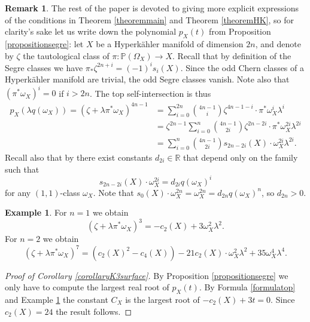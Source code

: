 \documentclass[11pt]{article}
\theoremstyle{plain}
\theoremstyle{definition}
\newtheorem{remark}[theorem]{Remark}
\newtheorem{example}[theorem]{Example}
\newcommand{\R}{\ensuremath{\mathbb{R}}}
\newcommand{\PP}{\ensuremath{\mathbb{P}}}
\begin{document}
\begin{remark}
The rest of the paper is devoted to giving more explicit expressions of the conditions
in Theorem \ref{theoremmain} and Theorem \ref{theoremHK}, so for clarity's sake let us write down the polynomial
$p_X(t)$ from Proposition \ref{propositionsegre}:
let $X$ be a Hyperkähler manifold of dimension $2n$, and denote by $\zeta$ the tautological class of $\pi: \PP(\Omega_X)\to X$.
Recall that by definition of the Segre classes we have $\pi_* \zeta^{2n+i}=(-1)^i s_i(X)$.
Since the odd Chern classes of a Hyperkähler manifold are trivial,
the odd Segre classes vanish. Note also that $(\pi^*\omega_X)^i=0$ if $i > 2n$.
The top self-intersection is thus
\begin{equation}\label{formulatop}
\begin{split}
p_X(\lambda q(\omega_X))= (\zeta+\lambda \pi^*\omega_X)^{4n-1}&=\sum_{i=0}^{2n} \binom{4n-1}{i}\zeta^{4n-1-i} \cdot \pi^*\omega_X^{i} \lambda^i
\\ &= \zeta^{2n-1}\sum_{i=0}^{n} \binom{4n-1}{2i} \zeta^{2n-2i} \cdot \pi^* \omega_X^{2i} \lambda^{2i}
\\ &=\sum_{i=0}^{n} \binom{4n-1}{2i} s_{2n-2i}(X) \cdot \omega_X^{2i} \lambda^{2i}.
\end{split}
\end{equation}
Recall also
that by \cite[Rem.\,4.12]{F87}
there exist constants $d_{2i} \in \R$
that depend only on the family such that
\begin{equation}\label{intersectionsegre}
s_{2n-2i}(X) \cdot \omega_X^{2i}= d_{2i} q(\omega_X)^{i}
\end{equation}
for any $(1,1)$-class $\omega_X$. Note that $s_{0}(X) \cdot \omega_X^{2n}= \omega_X^{2n} = d_{2n} q(\omega_X)^{n}$, so $d_{2n}>0$.
\end{remark}

\begin{example} \label{exampletop}
For $n=1$ we obtain
\[
(\zeta+\lambda \pi^*\omega_X)^{3} = - c_2(X)+3 \omega_X^2 \lambda^2.
\]
For $n=2$ we obtain
\[
(\zeta+ \lambda\pi^* \omega_X)^7
=(c_2(X)^2-c_4(X))-21 c_2(X) \cdot \omega_X^2 \lambda^2+ 35 \omega_X^4 \lambda^4.
\]
\end{example}

\begin{proof}[Proof of Corollary \ref{corollaryK3surface}]
By Proposition \ref{propositionsegre} we only have to compute the
largest real root of $p_X(t)$.
By Formula \eqref{formulatop} and
Example \ref{exampletop} the constant $C_X$ is the largest root of $-c_2(X)+3 t=0$. Since $c_2(X)=24$ the result follows.
\end{proof}
\end{document}
